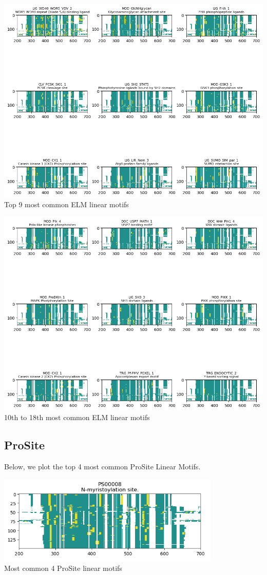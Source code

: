 \documentclass[10pt,twocolumn,letterpaper]{article}
\begin{document}
\label{sec:elm_motifs}
\begin{center}
    \includegraphics[scale=0.8]{report/img/Elm1.png} \\
    \small{Top 9 most common ELM linear motifs}
\end{center}
\begin{center}
    \includegraphics[scale=0.8]{report/img/Elm2.png} \\
    \small{10th to 18th most common ELM linear motifs}
\end{center}

\newpage
\subsection{ProSite}
\label{sec:prosite_motifs}

Below, we plot the top 4 most common ProSite Linear Motifs. \\

\begin{center}
    \includegraphics[scale=0.58]{report/img/Prosite.png} \\
    \small{Most common 4 ProSite linear motifs}
\end{center}
\end{document}
